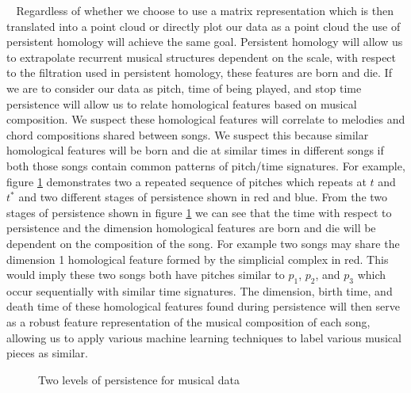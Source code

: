 \documentclass[11pt, a4paper]{article}
\begin{document}
\begin{enumerate}
\begin{itemize}
\begin{itemize}
      $\ \ \ \ $Regardless of whether we choose to use a matrix representation which is then translated into a point cloud or directly plot our data as a point cloud the use of persistent homology will achieve the same goal. Persistent homology will allow us to extrapolate recurrent musical structures dependent on the scale, with respect to the filtration used in persistent homology, these features are born and die. If we are to consider our data as pitch, time of being played, and stop time persistence will allow us to relate homological features based on musical composition. We suspect these homological features will correlate to melodies and chord compositions shared between songs. We suspect this because similar homological features will be born and die at similar times in different songs if both those songs contain common patterns of pitch/time signatures. For example, figure \ref{fig:persMusic} demonstrates two a repeated sequence of pitches which repeats at $t$ and $t^*$ and two different stages of persistence shown in red and blue. From the two stages of persistence shown in figure \ref{fig:persMusic} we can see that the time with respect to persistence and the dimension homological features are born and die will be dependent on the composition of the song. For example two songs may share the dimension 1 homological feature formed by the simplicial complex in red. This would imply these two songs both have pitches similar to $p_1$, $p_2$, and $p_3$ which occur sequentially with similar time signatures. The dimension, birth time, and death time of these homological features found during persistence will then serve as a robust feature representation of the musical composition of each song, allowing us to apply various machine learning techniques to label various musical pieces as similar.

      \begin{figure}[H]
        \centering
        \label{fig:persMusic}
        \label{fig:persMusic}
        \caption{Two levels of persistence for musical data}
        \label{fig:persMusic}
      \end{figure}


\end{itemize}
\end{itemize}
\end{enumerate}
\end{document}
